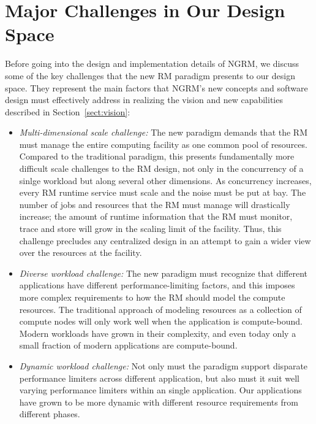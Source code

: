 \documentclass{article}
\newcommand{\ngrm}{NGRM}
\begin{document}
\section{Major Challenges in Our Design Space}

Before going into the design and implementation details of \ngrm, we discuss 
some of the key challenges that the new RM paradigm presents to our design space. 
They represent the main factors that \ngrm's new concepts and software design
must effectively address in realizing the vision and new capabilities described in 
Section~\ref{sect:vision}: 
\begin{itemize}
\item{\sl Multi-dimensional scale challenge:} The new paradigm demands that 
      the RM must manage the entire computing facility as one common pool of 
      resources. Compared to the traditional paradigm, this presents 
      fundamentally more difficult scale challenges to the RM design,
      not only in the concurrency of a sinlge workload but along
      several other dimensions. As concurrency increases, every RM runtime
      service must scale and the noise must be put at bay.  
      The number of jobs and resources 
      that the RM must manage will drastically increase; the amount 
      of runtime information that the RM must monitor, trace and store 
      will grow in the scaling limit of the facility.
      Thus, this challenge precludes any centralized design in an attempt to 
      gain a wider view over the resources at the facility. 

\item{\sl Diverse workload challenge:} The new paradigm must recognize that
      different applications have different performance-limiting factors,
      and this imposes more complex requirements to how the RM should
      model the compute resources. The traditional approach of modeling 
      resources as a collection of compute nodes will only work well when the
      application is compute-bound. Modern workloads have grown in their
      complexity, and even today only a small fraction of modern applications
      are compute-bound.
       
\item{\sl Dynamic workload challenge:} Not only must the paradigm support 
      disparate performance limiters across different application, but
      also must it suit well varying performance limiters within 
      an single application. Our applications have grown to be more
      dynamic with different resource requirements from different
      phases.


\end{itemize}
\end{document}

